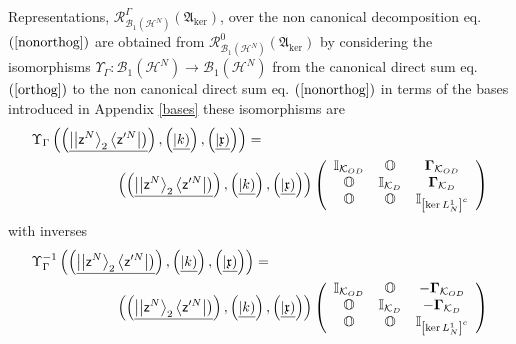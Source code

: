 \documentclass[aps,preprint]{revtex4}%
\begin{document}
Representations, $\mathcal{R}_{\mathcal{B}_{1}\left(  \mathcal{H}^{N}\right)
}^{\Gamma}\left(  \mathfrak{A}_{\ker}\right)  $, over the non canonical
decomposition eq. $\left(  \ref{nonorthog}\right)  $ are obtained from
$\mathcal{R}_{\mathcal{B}_{1}\left(  \mathcal{H}^{N}\right)  }^{0}\left(
\mathfrak{A}_{\ker}\right)  $ by considering the isomorphisms $\Upsilon
_{\Gamma}:\mathcal{B}_{1}\left(  \mathcal{H}^{N}\right)  \rightarrow
\mathcal{B}_{1}\left(  \mathcal{H}^{N}\right)  $ from the canonical direct sum
eq. $\left(  \ref{orthog}\right)  $ to the non canonical direct sum eq.
$\left(  \ref{nonorthog}\right)  $ in terms of the bases introduced in
Appendix \ref{bases} these isomorphisms are
\begin{align}
&  \Upsilon_{\Gamma}\left(  \left(  \underline{\left\vert \left\vert
\mathsf{z}^{N}\right\rangle _{2}\left\langle \mathsf{z}^{\prime N}\right\vert
\right)  }\right)  ,\left(  \underline{\left\vert k\right)  }\right)  ,\left(
\underline{\left\vert \mathfrak{x}\right)  }\right)  \right)  =\nonumber\\
&  \qquad\qquad\qquad\left(  \left(  \underline{\left\vert \left\vert
\mathsf{z}^{N}\right\rangle _{2}\left\langle \mathsf{z}^{\prime N}\right\vert
\right)  }\right)  ,\left(  \underline{\left\vert k\right)  }\right)  ,\left(
\underline{\left\vert \mathfrak{x}\right)  }\right)  \right)  \left(
\begin{array}
[c]{ccc}%
\mathbb{I}_{\mathcal{K}_{OD}} & \mathbb{O} & \mathbf{\Gamma}_{\mathcal{K}%
_{OD}}\\
\mathbb{O} & \mathbb{I}_{\mathcal{K}_{D}} & \mathbf{\Gamma}_{\mathcal{K}_{D}%
}\\
\mathbb{O} & \mathbb{O} & \mathbb{I}_{\left[  \ker L_{N}^{1}\right]  ^{c}}%
\end{array}
\right)
\end{align}
with inverses
\begin{align}
&  \Upsilon_{\Gamma}^{-1}\left(  \left(  \underline{\left\vert \left\vert
\mathsf{z}^{N}\right\rangle _{2}\left\langle \mathsf{z}^{\prime N}\right\vert
\right)  }\right)  ,\left(  \underline{\left\vert k\right)  }\right)  ,\left(
\underline{\left\vert \mathfrak{x}\right)  }\right)  \right)  =\nonumber\\
&  \qquad\qquad\qquad\left(  \left(  \underline{\left\vert \left\vert
\mathsf{z}^{N}\right\rangle _{2}\left\langle \mathsf{z}^{\prime N}\right\vert
\right)  }\right)  ,\left(  \underline{\left\vert k\right)  }\right)  ,\left(
\underline{\left\vert \mathfrak{x}\right)  }\right)  \right)  \left(
\begin{array}
[c]{ccc}%
\mathbb{I}_{\mathcal{K}_{OD}} & \mathbb{O} & -\mathbf{\Gamma}_{\mathcal{K}%
_{OD}}\\
\mathbb{O} & \mathbb{I}_{\mathcal{K}_{D}} & -\mathbf{\Gamma}_{\mathcal{K}_{D}%
}\\
\mathbb{O} & \mathbb{O} & \mathbb{I}_{\left[  \ker L_{N}^{1}\right]  ^{c}}%
\end{array}
\right)
\end{align}
\end{document}

